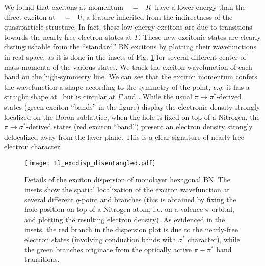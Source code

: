 We found that excitons at momentum $\qq=K$ have a lower energy than the direct exciton at $\qq=0$, a feature inherited from the indirectness of the quasiparticle structure. In fact, these low-energy excitons are due to transitions towards the nearly-free electron states at $\Gamma$.
These new excitonic states are clearly distinguishable from the ``standard'' BN excitons by plotting their wavefunctions in real space, as it is done in the insets of Fig. \ref{fig:mBN_excdisp_wf} for several different center-of-mass momenta of the various states. 
We track the exciton wavefunction of each band on the high-symmetry line. We can see that the exciton momentum confers the wavefunction a shape according to the symmetry of the point, \textit{e.g.} it has a straight shape at \MM~but is circular at $\Gamma$ and \KK. 
While the usual $\pi \rightarrow \pi^*$-derived states (green exciton ``bands'' in the figure) display the electronic density strongly localized on the Boron sublattice, when the hole is fixed on top of a Nitrogen, the $\pi \rightarrow \sigma^*$-derived states (red exciton ``band'') present an electron density strongly delocalized away from the layer plane. This is a clear signature of nearly-free electron character.
\begin{figure}[h!b]
	\vspace{0.2cm}
	\setcapindent{2em}
	\centering
	\texttt{[image: 1l\_excdisp\_disentangled.pdf]}
	\caption{Details of the exciton dispersion of monolayer hexagonal BN. The insets show the spatial localization of the exciton wavefunction at several different $q$-point and branches (this is obtained by fixing the hole position on top of a Nitrogen atom, i.e. on a valence $\pi$ orbital, and plotting the resulting electron density). As evidenced in the insets, the red branch in the dispersion plot is due to the nearly-free electron states (involving conduction bands with $\sigma^*$ character), while the green branches originate from the optically active $\pi-\pi^*$ band transitions.}
	\label{fig:mBN_excdisp_wf}
\end{figure}


%
